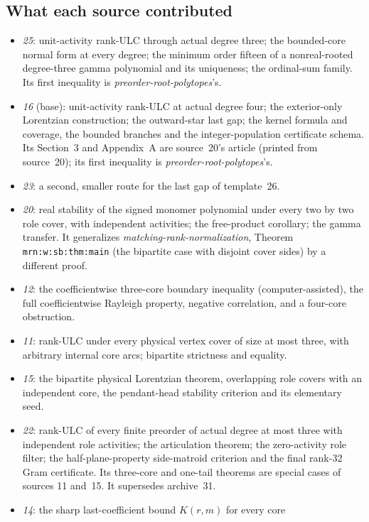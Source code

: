 \documentclass[11pt]{article}
\numberwithin{equation}{section}
\theoremstyle{definition}\newtheorem{definition}[theorem]{Definition}\newtheorem{remark}[theorem]{Remark}
\newcommand{\prp}{\emph{preorder-root-polytopes}}
\newcommand{\mrn}{\emph{matching-rank-normalization}}
\begin{document}
\subsection{What each source contributed}\label{pgr:sec:prov:contrib}
\begin{itemize}[leftmargin=*]
\item \emph{25}: unit-activity rank-ULC through actual degree three; the
  bounded-core normal form at every degree; the minimum order fifteen of a
  nonreal-rooted degree-three gamma polynomial and its uniqueness; the
  ordinal-sum family. Its first inequality is \prp's.
\item \emph{16} (base): unit-activity rank-ULC at actual degree four; the
  exterior-only Lorentzian construction; the outward-star last gap; the
  kernel formula and coverage, the bounded branches and the integer-population
  certificate schema. Its Section~3 and Appendix~A are source~20's article
  (printed from source~20); its first inequality is \prp's.
\item \emph{23}: a second, smaller route for the last gap of template~26.
\item \emph{20}: real stability of the signed monomer polynomial under every
  two by two role cover, with independent activities; the free-product
  corollary; the gamma transfer. It generalizes \mrn, Theorem
  \texttt{mrn:w:sb:thm:main} (the bipartite case with disjoint cover sides)
  by a different proof.
\item \emph{12}: the coefficientwise three-core boundary inequality
  (computer-assisted), the full coefficientwise Rayleigh property,
  negative correlation, and a four-core obstruction.
\item \emph{11}: rank-ULC under every physical vertex cover of size at most
  three, with arbitrary internal core arcs; bipartite strictness and
  equality.
\item \emph{15}: the bipartite physical Lorentzian theorem, overlapping
  role covers with an independent core, the pendant-head stability
  criterion and its elementary seed.
\item \emph{22}: rank-ULC of every finite preorder of actual degree at most
  three with independent role activities; the articulation theorem; the
  zero-activity role filter; the half-plane-property side-matroid
  criterion and the final rank-32 Gram certificate. Its three-core and
  one-tail theorems are special cases of sources 11 and~15. It supersedes
  archive~31.
\item \emph{14}: the sharp last-coefficient bound $K(r,m)$ for every core

\end{itemize}
\end{document}
